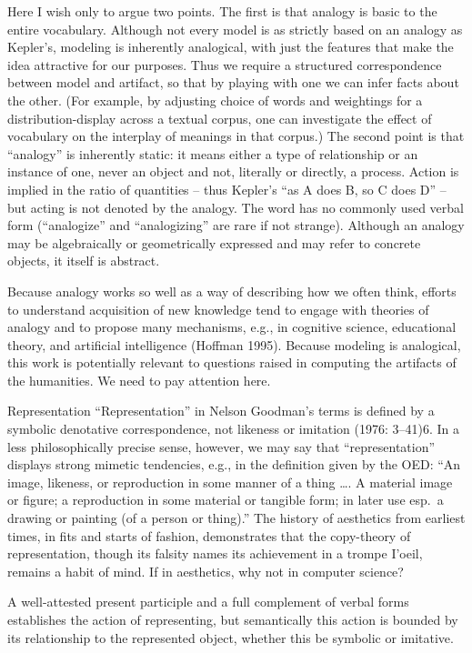 Here I wish only to argue two points. The first is that analogy is basic
to the entire vocabulary. Although not every model is as strictly based
on an analogy as Kepler's, modeling is inherently analogical, with just
the features that make the idea attractive for our purposes. Thus we
require a structured correspondence between model and artifact, so that
by playing with one we can infer facts about the other. (For example, by
adjusting choice of words and weightings for a distribution-display
across a textual corpus, one can investigate the effect of vocabulary on
the interplay of meanings in that corpus.) The second point is that
``analogy'' is inherently static: it means either a type of relationship
or an instance of one, never an object and not, literally or directly, a
process. Action is implied in the ratio of quantities -- thus Kepler's
``as A does B, so C does D'' -- but acting is not denoted by the
analogy. The word has no commonly used verbal form (``analogize'' and
``analogizing'' are rare if not strange). Although an analogy may be
algebraically or geometrically expressed and may refer to concrete
objects, it itself is abstract.

Because analogy works so well as a way of describing how we often think,
efforts to understand acquisition of new knowledge tend to engage with
theories of analogy and to propose many mechanisms, e.g., in cognitive
science, educational theory, and artificial intelligence (Hoffman 1995).
Because modeling is analogical, this work is potentially relevant to
questions raised in computing the artifacts of the humanities. We need
to pay attention here.

Representation ``Representation'' in Nelson Goodman's terms is defined
by a symbolic denotative correspondence, not likeness or imitation
(1976: 3--41)6. In a less philosophically precise sense, however, we may
say that ``representation'' displays strong mimetic tendencies, e.g., in
the definition given by the OED: ``An image, likeness, or reproduction
in some manner of a thing \ldots. A material image or figure; a
reproduction in some material or tangible form; in later use esp.~a
drawing or painting (of a person or thing).'' The history of aesthetics
from earliest times, in fits and starts of fashion, demonstrates that
the copy-theory of representation, though its falsity names its
achievement in a trompe I'oeil, remains a habit of mind. If in
aesthetics, why not in computer science?

A well-attested present participle and a full complement of verbal forms
establishes the action of representing, but semantically this action is
bounded by its relationship to the represented object, whether this be
symbolic or imitative.

